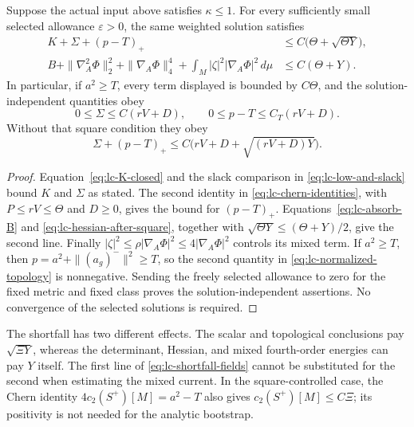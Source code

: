 \begin{theorem}\label{thm:lc-normalized}
Suppose the actual input above satisfies $\kappa\le1$.  For every
sufficiently small selected allowance $\varepsilon>0$, the same
weighted solution satisfies
\begin{equation}\label{eq:lc-shortfall-fields}
\begin{split}
 K+\Sigma+(p-T)_+&\le C\bigl(\Theta+\sqrt{\Theta Y}\bigr),\\
 B+\|\nabla_A^2\Phi\|_2^2+\|\nabla_A\Phi\|_4^4
       +\int_M|\zeta|^2|\nabla_A\Phi|^2\,d\mu
       &\le C(\Theta+Y).
\end{split}
\end{equation}
In particular, if $a^2\ge T$, every term displayed is bounded by
$C\Theta$, and the solution-independent quantities obey
\begin{equation}\label{eq:lc-normalized-topology}
 0\le\Sigma\le C(rV+D),\qquad
 0\le p-T\le C_T(rV+D).
\end{equation}
Without that square condition they obey
\begin{equation}\label{eq:lc-normalized-shortfall}
 \Sigma+(p-T)_+
 \le C\bigl(rV+D+\sqrt{(rV+D)Y}\bigr).
\end{equation}
\end{theorem}

\begin{proof}
Equation~\eqref{eq:lc-K-closed} and the slack comparison in
\eqref{eq:lc-low-and-slack} bound $K$ and $\Sigma$ as stated.
The second identity in \eqref{eq:lc-chern-identities}, with
$P\le rV\le\Theta$ and $D\ge0$, gives the bound for $(p-T)_+$.
Equations~\eqref{eq:lc-absorb-B} and
\eqref{eq:lc-hessian-after-square}, together with
$\sqrt{\Theta Y}\le(\Theta+Y)/2$, give the second line.
Finally $|\zeta|^2\le\rho|\nabla_A\Phi|^2\le4|\nabla_A\Phi|^2$
controls its mixed term.  If $a^2\ge T$, then
$p=a^2+\|(a_g)^-\|^2\ge T$, so the second quantity in
\eqref{eq:lc-normalized-topology} is nonnegative.  Sending the freely
selected allowance to zero for the fixed metric and fixed class proves
the solution-independent assertions.  No convergence of the selected
solutions is required.
\end{proof}

\begin{remark}\label{rem:lc-square-cost}
The shortfall has two different effects.  The scalar and topological
conclusions pay $\sqrt{\Xi Y}$, whereas the determinant, Hessian,
and mixed fourth-order energies can pay $Y$ itself.  The first line of
\eqref{eq:lc-shortfall-fields} cannot be substituted for the second
when estimating the mixed current.  In the square-controlled case,
the Chern identity $4c_2(S^+)[M]=a^2-T$ also gives
$c_2(S^+)[M]\le C\Xi$; its positivity is not needed for the analytic
bootstrap.
\end{remark}


